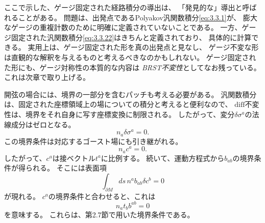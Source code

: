 ここで示した、ゲージ固定された経路積分の導出は、
「発見的な」導出と呼ばれることがある。
問題は、出発点であるPolyakov汎関数積分\eqref{eq:3.3.1}が、
膨大なゲージの重複計数のために明確に定義されていないことである。
一方、ゲージ固定された汎関数積分\eqref{eq:3.3.22}はきちんと定義されており、
具体的に計算できる。
実用上は、ゲージ固定された形を真の出発点と見なし、
ゲージ不変な形は直観的な解釈を与えるものと考えるべきなのかもしれない。
ゲージ固定された形にも、ゲージ対称性の本質的な内容は
\emph{BRST不変性}としてなお残っている。これは次章で取り上げる。

開弦の場合には、境界の一部分を含むパッチも考える必要がある。
汎関数積分は、固定された座標領域上の場についての積分と考えると便利なので、
$\mathrm{diff}$不変性は、境界をそれ自身に写す座標変換に制限される。
したがって、変分$\delta\sigma^a$の法線成分はゼロとなる。
\begin{equation}
n_a\delta\sigma^a=0.
\tag{3.3.25}\label{eq:3.3.25}
\end{equation}
この境界条件は対応するゴースト場にも引き継がれる。
\begin{equation}
n_ac^a=0.
\tag{3.3.26}\label{eq:3.3.26}
\end{equation}
したがって、$c^a$は接ベクトル$t^a$に比例する。
続いて、運動方程式から$b_{ab}$の境界条件が得られる。
そこには表面項
\begin{equation}
\int_{\partial M}ds\,n^ab_{ab}\delta c^b=0
\tag{3.3.27}\label{eq:3.3.27}
\end{equation}
が現れる。
$c^a$の境界条件と合わせると、これは
\begin{equation}
n_at_bb^{ab}=0
\tag{3.3.28}\label{eq:3.3.28}
\end{equation}
を意味する。
これらは、第2.7節で用いた境界条件である。

